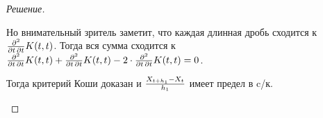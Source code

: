 \documentclass[12pt,a4paper]{extarticle}
\renewcommand*\dd{\mathop{}\!\partial}
\begin{document}
\begin{proof}[Решение]
\begin{itemize}
		Но внимательный зритель заметит, что каждая длинная дробь сходится к ${\dd^2 \over \dd t \dd t} K(t, t)$. Тогда вся сумма сходится к ${\dd^2 \over \dd t \dd t} K(t, t) + {\dd^2 \over \dd t \dd t} K(t, t) - 2 \cdot {\dd^2 \over \dd t \dd t} K(t, t) = 0$. 
		
		Тогда критерий Коши доказан и ${X_{t + h_1} - X_t \over h_1}$ имеет предел в c/к.
		
	\end{itemize}
	
\end{proof}
\end{document}
